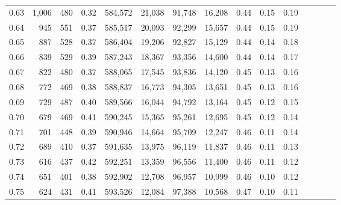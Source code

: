 \begin{tabular}{rrrcrrrrrrrrrrr}
0.63 &   1,006 &    480 &                                       0.32 &  584,572 &   21,038 &   91,748 &   16,208 &  0.44 &  0.15 &                         0.19 \\
0.64 &     945 &    551 &                                       0.37 &  585,517 &   20,093 &   92,299 &   15,657 &  0.44 &  0.15 &                         0.19 \\
0.65 &     887 &    528 &                                       0.37 &  586,404 &   19,206 &   92,827 &   15,129 &  0.44 &  0.14 &                         0.18 \\
0.66 &     839 &    529 &                                       0.39 &  587,243 &   18,367 &   93,356 &   14,600 &  0.44 &  0.14 &                         0.17 \\
0.67 &     822 &    480 &                                       0.37 &  588,065 &   17,545 &   93,836 &   14,120 &  0.45 &  0.13 &                         0.16 \\
0.68 &     772 &    469 &                                       0.38 &  588,837 &   16,773 &   94,305 &   13,651 &  0.45 &  0.13 &                         0.16 \\
0.69 &     729 &    487 &                                       0.40 &  589,566 &   16,044 &   94,792 &   13,164 &  0.45 &  0.12 &                         0.15 \\
0.70 &     679 &    469 &                                       0.41 &  590,245 &   15,365 &   95,261 &   12,695 &  0.45 &  0.12 &                         0.14 \\
0.71 &     701 &    448 &                                       0.39 &  590,946 &   14,664 &   95,709 &   12,247 &  0.46 &  0.11 &                         0.14 \\
0.72 &     689 &    410 &                                       0.37 &  591,635 &   13,975 &   96,119 &   11,837 &  0.46 &  0.11 &                         0.13 \\
0.73 &     616 &    437 &                                       0.42 &  592,251 &   13,359 &   96,556 &   11,400 &  0.46 &  0.11 &                         0.12 \\
0.74 &     651 &    401 &                                       0.38 &  592,902 &   12,708 &   96,957 &   10,999 &  0.46 &  0.10 &                         0.12 \\
0.75 &     624 &    431 &                                       0.41 &  593,526 &   12,084 &   97,388 &   10,568 &  0.47 &  0.10 &                         0.11 \\

\end{tabular}
